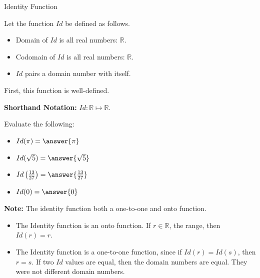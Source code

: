 \documentclass{ximera}
\begin{document}
\begin{example} Identity Function 

Let the function $Id$ be defined as follows.


\begin{itemize}
\item Domain of $Id$ is all real numbers: $\mathbb{R}$.
\item Codomain of $Id$ is all real numbers: $\mathbb{R}$.
\item $Id$ pairs a domain number with itself.
\end{itemize}


First, this function is well-defined.


\textbf{Shorthand Notation: } $Id: \mathbb{R} \mapsto \mathbb{R}$.

\begin{question}
Evaluate the following:

\begin{itemize}
	\item $Id(\pi) = \answer{\pi}$
	\item $Id(\sqrt{5}) = \answer{\sqrt{5}}$
	\item $Id\left(\frac{13}{27}\right) = \answer{\frac{13}{27}}$
	\item $Id(0) = \answer{0}$
\end{itemize}

\end{question}




\textbf{Note:} The identity function both a one-to-one and onto function.

\begin{itemize}
\item The Identity function is an onto function.  If $r \in \mathbb{R}$, the range, then $Id(r) = r$. 
\item The Identity function is a one-to-one function, since if $Id(r)=Id(s)$, then $r = s$.  If two $Id$ values are equal, then the domain numbers are equal. They were not different domain numbers.
\end{itemize}



\end{example}
\end{document}
